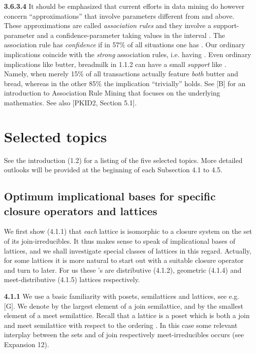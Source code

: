 \documentclass[11pt]{article}
\begin{document}
{\bf 3.6.3.4} It should be emphasized that current efforts in data mining do however concern ``approximations'' that involve parameters different from  and  above. These approximations are called {\it association rules} and they involve a support-parameter  and a confidence-parameter  taking values in the interval . The association rule  has {\it confidence}  if in 57\% of all situations  one has . Our ordinary implications  coincide with the {\it strong} association rules, i.e. having . Even ordinary implications like butter, breadmilk in 1.1.2 can have a small {\it support} like . Namely, when merely 15\% of all transactions  actually feature {\it both} butter and bread, whereas in the other 85\% the implication ``trivially'' holds. See [B] for an introduction to Association Rule Mining that focuses on the underlying mathematics. See also [PKID2, Section 5.1].




\section{Selected topics}

See the introduction (1.2) for a listing of the five selected topics. More detailed outlooks will be provided at the beginning of each Subsection 4.1 to 4.5.

\subsection{Optimum implicational bases for specific closure operators and lattices}

We first show (4.1.1) that {\it each} lattice  is isomorphic to a closure system  on the set  of its join-irreducibles. It thus makes sense to speak of implicational bases of lattices, and we shall investigate special classes of lattices in this regard. Actually, for some lattices  it is more natural to start out with a suitable closure operator  and turn to  later. For us these 's are distributive (4.1.2), geometric (4.1.4) and meet-distributive (4.1.5) lattices respectively.

 
{\bf 4.1.1} We use a basic familiarity with posets, semilattices and lattices, see e.g. [G]. We denote by  the largest element of a join semilattice, and by  the smallest element of a meet semilattice. Recall that a lattice is a poset  which is both a join and meet semilattice with respect to the ordering . In this case some relevant interplay between the sets  and  of join respectively meet-irreducibles occurs (see Expansion 12).
\end{document}
